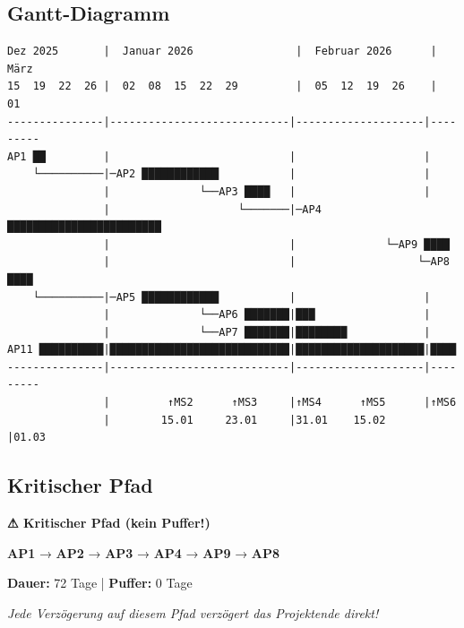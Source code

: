 \documentclass[11pt,a4paper]{article}
\begin{document}
\subsection{Gantt-Diagramm}

\begin{tcolorbox}[fabox]
\small
\begin{verbatim}
Dez 2025       |  Januar 2026                |  Februar 2026      |  März
15  19  22  26 |  02  08  15  22  29         |  05  12  19  26    |  01
---------------|----------------------------|--------------------|---------
AP1 ██         |                            |                    |
    └──────────|─AP2 ████████████           |                    |
               |              └──AP3 ████   |                    |
               |                    └───────|─AP4 ████████████████████████
               |                            |              └─AP9 ████
               |                            |                   └─AP8 ████
    └──────────|─AP5 ████████████           |                    |
               |              └──AP6 ███████|███                 |
               |              └──AP7 ███████|████████            |
AP11 ██████████|████████████████████████████|████████████████████|████
---------------|----------------------------|--------------------|---------
               |         ↑MS2      ↑MS3     |↑MS4      ↑MS5      |↑MS6
               |        15.01     23.01     |31.01    15.02      |01.03
\end{verbatim}
\end{tcolorbox}

\subsection{Kritischer Pfad}

\begin{tcolorbox}[warningbox]
\textbf{⚠ Kritischer Pfad (kein Puffer!)}

\vspace{0.3cm}
\textbf{AP1} → \textbf{AP2} → \textbf{AP3} → \textbf{AP4} → \textbf{AP9} → \textbf{AP8}

\vspace{0.3cm}
\textbf{Dauer:} 72 Tage | \textbf{Puffer:} 0 Tage

\vspace{0.3cm}
\textit{Jede Verzögerung auf diesem Pfad verzögert das Projektende direkt!}
\end{tcolorbox}

\newpage
\end{document}
